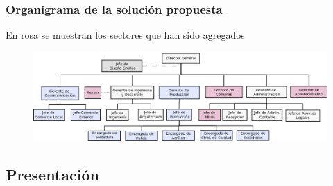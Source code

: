 \documentclass[a4paper,10pt,titlepage]{article}
\begin{document}
\newpage
\subsubsection{Organigrama de la soluci\'on propuesta}
En rosa se muestran los sectores que han sido agregados
\begin{figure}[H]
\centering
\includegraphics[angle=90,scale=0.5]{./Organigramas/OrganiHipotesis.png}
\end{figure}

\newpage
\vspace*{\fill}
\begin{center}
\begingroup
\titlerule
\vspace{1cm}
\section{Presentaci\'on}
\vspace{1cm}
\titlerule
\endgroup
\end{center}
\vspace*{\fill}
\end{document}
